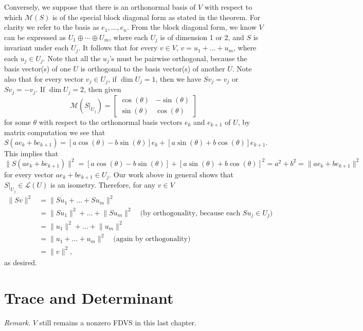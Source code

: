 \documentclass[11pt]{article}
\renewcommand{\d}{\dim}
\newcommand{\nm}[1]{\lVert #1 \rVert}
\newcommand{\M}{\mathcal{M}}
\begin{document}
\begin{itemize}
    Conversely, we suppose that there is an orthonormal basis of $V$ with respect to which $\M(S)$ is of the special block diagonal form as stated in the theorem. For clarity we refer to the basis as $e_1,\dots,e_n$. From the block diagonal form, we know $V$ can be expressed as $U_1 \oplus \cdots \oplus U_m$, where each $U_j$ is of dimension 1 or 2, and $S$ is invariant under each $U_j$. It follows that for every $v \in V$, $v = u_1 + \dots + u_m$, where each $u_j \in U_j$. Note that all the $u_j$'s must be pairwise orthogonal, because the basis vector(s) of one $U$ is orthogonal to the basis vector(s) of another $U$. Note also that for every vector $v_j \in U_j$, if $\d U_j = 1$, then we have $Sv_j = v_j$ or $Sv_j = -v_j$. If $\d U_j = 2$, then given \[\M(S|_{U_j}) = \begin{bmatrix}
        \cos(\theta) & -\sin(\theta) \\ \sin(\theta) & \cos(\theta)
    \end{bmatrix}\] for some $\theta$ with respect to the orthonormal basis vectors $e_k$ and $e_{k+1}$ of $U$, by matrix computation we see that \[S(ae_k + be_{k+1}) = [a \cos(\theta) - b\sin(\theta)]e_k + [a \sin(\theta) + b\cos(\theta)]e_{k+1}.\] This implies that \[\nm{S(ae_k + be_{k+1})}^2 = [a \cos(\theta) - b\sin(\theta)] + [a \sin(\theta) + b\cos(\theta)]^2 = a^2 + b^2 = \nm{ae_k + be_{k+1}}^2\] for every vector $ae_k + be_{k+1} \in U_j$. Our work above in general shows that $S|_{U_j} \in \mathcal{L}(U)$ is an isometry. Therefore, for any $v \in V$
    \begin{align*}
        \nm{Sv}^2 & = \nm{Su_1 + \dots + Su_m}^2 \\ & = \nm{Su_1}^2 + \dots + \nm{Su_m}^2 \quad \text{(by orthogonality, because each $Su_j \in U_j$)}\\ & = \nm{u_1}^2 + \dots + \nm{u_m}^2 \\ & = \nm{u_1 + \dots + u_m}^2 \quad \text{(again by orthogonality)} \\ & = \nm{v}^2,
    \end{align*}
    as desired.
\end{itemize}

\newpage
\section{Trace and Determinant}
\textit{Remark.} $V$ still remains a nonzero FDVS in this last chapter.

\setcounter{secnumdepth}{1}
\end{document}
